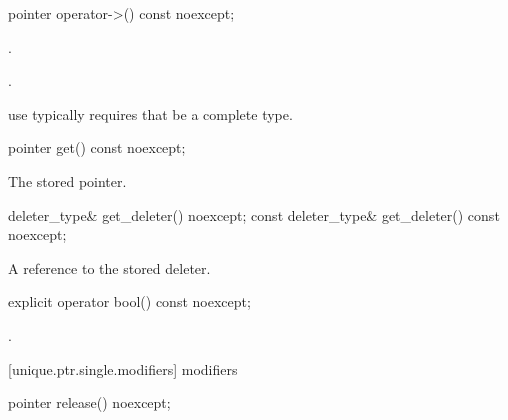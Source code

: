 \begin{itemdecl}
pointer operator->() const noexcept;
\end{itemdecl}

\begin{itemdescr}
\pnum
\requires {}.

\pnum
\returns {}.

\pnum
\realnote use typically requires that  be a complete type.
\end{itemdescr}

\begin{itemdecl}
pointer get() const noexcept;
\end{itemdecl}

\begin{itemdescr}
\pnum
\returns The stored pointer.
\end{itemdescr}

\begin{itemdecl}
deleter_type& get_deleter() noexcept;
const deleter_type& get_deleter() const noexcept;
\end{itemdecl}

\begin{itemdescr}
\pnum
\returns A reference to the stored deleter.
\end{itemdescr}

\begin{itemdecl}
explicit operator bool() const noexcept;
\end{itemdecl}

\begin{itemdescr}
\pnum
\returns {}.
\end{itemdescr}

[unique.ptr.single.modifiers]{ modifiers}

\begin{itemdecl}
pointer release() noexcept;
\end{itemdecl}

